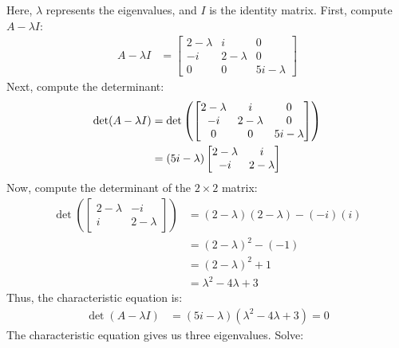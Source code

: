 \begin{enumerate}
Here, $\lambda$ represents the eigenvalues, and $I$ is the identity matrix. First, compute $A - \lambda I$:
\begin{align*}
    A - \lambda I &= \begin{bmatrix}
    2 - \lambda & i & 0 \\
    -i & 2 - \lambda & 0 \\
    0 & 0 & 5i - \lambda
    \end{bmatrix}
\end{align*}
Next, compute the determinant:
\begin{align}
    \det(A - \lambda I) &= \det\left(\begin{bmatrix}
    2 - \lambda & i & 0 \\
    -i & 2 - \lambda & 0 \\
    0 & 0 & 5i - \lambda
    \end{bmatrix}\right) \notag\\
    &= (5i - \lambda)\begin{bmatrix}
    2 - \lambda & i \\
    -i & 2 - \lambda
    \end{bmatrix}\notag
\end{align}
Now, compute the determinant of the $2 \times 2$ matrix:
\begin{align*}
    \det\left(\begin{bmatrix}
    2 - \lambda & -i \\
    i & 2 - \lambda
    \end{bmatrix}\right) &= (2 - \lambda)(2 - \lambda) - (-i)(i) \\
    &= (2 - \lambda)^2 - (-1) \\
    &= (2 - \lambda)^2 + 1 \\
    &= \lambda^2 - 4\lambda + 3
\end{align*}
Thus, the characteristic equation is:
\begin{align}
    \det(A - \lambda I) &= (5i - \lambda)(\lambda^2 - 4\lambda + 3) = 0
\end{align}
The characteristic equation gives us three eigenvalues. Solve:


\end{enumerate}

